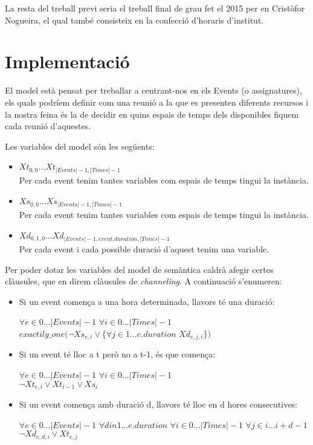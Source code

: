 \documentclass[11pt,a4paper,oneside]{article}
\begin{document}
    La resta del treball previ seria el treball final de grau fet el 2015 per en Cristòfor Nogueira, el qual també consisteix en la confecció d'horaris d'institut.

  \section{Implementació}


  El model està pensat per treballar a centrant-nos en els Events (o assignatures), 
  els quals podríem definir com una reunió a la que es presenten diferents recursos 
  i la nostra feina és la de decidir en quins espais de temps dels disponibles fiquem cada reunió d'aquestes.

  Les variables del model són les següents:
  \begin{itemize}
    \item $Xt_{0,0} . . . Xt_{|Events|-1,|Times|-1}$\\Per cada event tenim tantes variables com espais de 
    temps tingui la instància.
    \item $Xs_{0,0} . . . Xs_{|Events|-1,|Times|-1}$\\Per cada event tenim tantes variables com espais de temps tingui la instància.
    \item $Xd_{0,1,0} . . . Xd_{|Events|-1, event.duration, |Times|-1}$\\ Per cada event i cada possible duració d'aquest tenim una variable. 
  \end{itemize}

  Per poder dotar les variables del model de semàntica caldrà afegir certes clàusules, que en direm clàusules de \textit{channeling}. A continuació s'enumeren:
  \begin{itemize}
    \item Si un event comença a una hora determinada, llavors té una duració: \begin{center} $\forall e \in 0 ... |Events|-1$ $\forall i \in 0 ... |Times|-1$ \\$exactily\_one(\neg Xs_{e,i} \vee \{ \forall j \in 1 ... e.duration$ $Xd_{e,j,i}\})$\end{center}
    \item Si un event té lloc a t però no a t-1, és que comença: \begin{center} $\forall e \in 0 ... |Events|-1$ $\forall i \in 0 ... |Times|-1$ \\$\neg Xt_{e,i} \vee Xt_{i-1} \vee Xs_i$ \end{center}
    \item Si un event comença amb duració d, llavors té lloc en d hores consecutives: \begin{center} 
      $\forall e \in 0 ... |Events|-1$ $\forall d in 1 ... e.duration$ $\forall i \in 0 ... |Times|-1$ $\forall j \in i ... i+d-1$ \\
      $\neg Xd_{e,d,i} \vee Xt_{e,j}$
    
    \end{center}
  \end{itemize}
\end{document}

